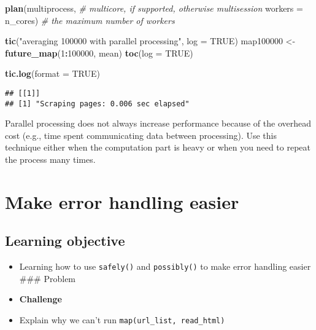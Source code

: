 \documentclass[
]{book}
\newenvironment{Shaded}{\begin{snugshade}}{\end{snugshade}}
\newcommand{\CommentTok}[1]{\textcolor[rgb]{0.56,0.35,0.01}{\textit{#1}}}
\newcommand{\DataTypeTok}[1]{\textcolor[rgb]{0.13,0.29,0.53}{#1}}
\newcommand{\DecValTok}[1]{\textcolor[rgb]{0.00,0.00,0.81}{#1}}
\newcommand{\KeywordTok}[1]{\textcolor[rgb]{0.13,0.29,0.53}{\textbf{#1}}}
\newcommand{\NormalTok}[1]{#1}
\newcommand{\OperatorTok}[1]{\textcolor[rgb]{0.81,0.36,0.00}{\textbf{#1}}}
\newcommand{\OtherTok}[1]{\textcolor[rgb]{0.56,0.35,0.01}{#1}}
\newcommand{\StringTok}[1]{\textcolor[rgb]{0.31,0.60,0.02}{#1}}
\begin{document}
\begin{Shaded}
\begin{Highlighting}[]
\KeywordTok{plan}\NormalTok{(multiprocess, }\CommentTok{\# multicore, if supported, otherwise multisession}
     \DataTypeTok{workers =}\NormalTok{ n\_cores) }\CommentTok{\# the maximum number of workers}

\KeywordTok{tic}\NormalTok{(}\StringTok{"averaging 100000 with parallel processing"}\NormalTok{, }\DataTypeTok{log =} \OtherTok{TRUE}\NormalTok{)}
\NormalTok{map100000 \textless{}{-}}\StringTok{ }\KeywordTok{future\_map}\NormalTok{(}\DecValTok{1}\OperatorTok{:}\DecValTok{100000}\NormalTok{, mean)}
\KeywordTok{toc}\NormalTok{(}\DataTypeTok{log =} \OtherTok{TRUE}\NormalTok{)}
\end{Highlighting}
\end{Shaded}

\begin{Shaded}
\begin{Highlighting}[]
\KeywordTok{tic.log}\NormalTok{(}\DataTypeTok{format =} \OtherTok{TRUE}\NormalTok{)}
\end{Highlighting}
\end{Shaded}

\begin{verbatim}
## [[1]]
## [1] "Scraping pages: 0.006 sec elapsed"
\end{verbatim}

Parallel processing does not always increase performance because of the overhead cost (e.g., time spent communicating data between processing). Use this technique either when the computation part is heavy or when you need to repeat the process many times.

\hypertarget{robustness}{%
\section{Make error handling easier}\label{robustness}}

\hypertarget{learning-objective}{%
\subsection{Learning objective}\label{learning-objective}}

\begin{itemize}
\item
  Learning how to use \texttt{safely()} and \texttt{possibly()} to make error handling easier
  \#\#\# Problem
\item
  \textbf{Challenge}
\item
  Explain why we can't run \texttt{map(url\_list,\ read\_html)}
\end{itemize}
\end{document}
